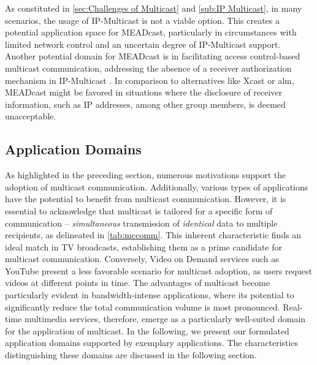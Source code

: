 As constituted in \autoref{sec:Challenges of Multicast} and
    \autoref{sub:IP Multicast}, in many scenarios, the usage of IP-Multicast
    is not a viable option.
This creates a potential application space for MEADcast, particularly in
    circumstances with limited network control and an uncertain degree of
    IP-Multicast support.
Another potential domain for MEADcast is in facilitating access control-based
    multicast communication, addressing the absence of a receiver authorization
    mechanism in IP-Multicast \cite{diot2000deployment}.
In comparison to alternatives like Xcast or \gls{alm}, MEADcast might be
    favored in situations where the disclosure of receiver information, such as
    IP addresses, among other group members, is deemed unacceptable.


\subsection{Application Domains} %
\label{sub:Application Domains}
As highlighted in the preceding section, numerous motivations support the
    adoption of multicast communication.
Additionally, various types of applications have the potential to benefit
    from multicast communication.
However, it is essential to acknowledge that multicast is tailored for a
    specific form of communication -- \textit{simultaneous} transmission of 
    \textit{identical} data to multiple recipients, as delineated in
    \autoref{tab:mccomm}.
This inherent characteristic finds an ideal match in TV broadcasts,
    establishing them as a prime candidate for multicast communication.
Conversely, Video on Demand services such as YouTube present a less favorable
    scenario for multicast adoption, as users request videos at different
    points in time.
The advantages of multicast become particularly evident in bandwidth-intense
    applications, where its potential to significantly reduce the total
    communication volume is most pronounced.
Real-time multimedia services, therefore, emerge as a particularly well-suited
    domain for the application of multicast.
In the following, we present our formulated application domains supported by 
    exemplary applications.
The characteristics distinguishing these domains are discussed in the
    following section.

